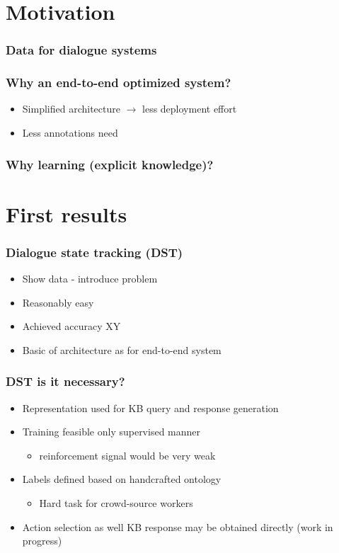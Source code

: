 \documentclass[10pt, compress,british,xcolor={svgnames,dvipsnames,x11names},trans]{beamer}
\begin{document}
\section{Motivation}  %


\begin{frame}\frametitle{Data for dialogue systems}
\end{frame}

\begin{frame}\frametitle{Why an end-to-end optimized system?}
    \begin{itemize}
        \item Simplified architecture $\longrightarrow$ less deployment effort
        \item Less annotations need 
    \end{itemize}
\end{frame}

\begin{frame}\frametitle{Why learning (explicit knowledge)?}
\end{frame}

\section{First results}  %


\begin{frame}\frametitle{Dialogue state tracking (DST)}
    \begin{itemize}
        \item Show data - introduce problem
        \item Reasonably easy
        \item Achieved accuracy XY
        \item Basic of architecture as for end-to-end system
    \end{itemize}
\end{frame}

\begin{frame}\frametitle{DST is it necessary?}
    \begin{itemize}
        \item Representation used for KB query and response generation
        \item Training feasible only supervised manner
        \begin{itemize}
            \item reinforcement signal would be very weak
        \end{itemize}
        \item Labels defined based on handcrafted ontology
        \begin{itemize}
            \item Hard task for crowd-source workers
        \end{itemize}
        \item Action selection as well KB response may be obtained directly (work in progress)
    \end{itemize}
\end{frame}
\end{document}
